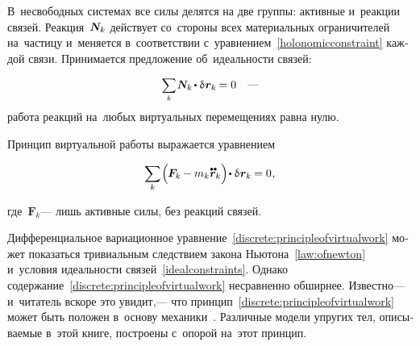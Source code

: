 \begin{otherlanguage}{russian}
В~несвободных системах все силы делятся на две группы: активные и~реакции связей. Реакция~$\mathboldN_k$ действует со~стороны всех материальных ограничителей на~частицу  и~меняется в~соответствии с~уравнением~\eqref{holonomicconstraint} каждой связи. Принимается предложение об~идеальности связей:

\nopagebreak\begin{equation}\label{idealconstraints}
\scalebox{0.9}{$\displaystyle \sum_k$} \hspace{.2ex} \mathboldN_k \hspace{-0.2ex} \dotp \variation{\hspace{.1ex}\bm{r}_k} \hspace{-0.16ex} = 0
\quad \textrm{---}
\vspace{-0.25em}\end{equation}
\noindent работа реакций на~любых виртуальных перемещениях равна нулю.

Принцип виртуальной работы выражается уравнением

\nopagebreak\vspace{-0.1em}\begin{equation}\label{discrete:principleofvirtualwork}
\displaystyle \sum_{\smash{k}} \hspace{-0.2ex} \left(^{\mathstrut} \hspace{-0.25ex} \bm{F}_k \hspace{-0.12ex} - m_k \mathdotdotabove{\bm{r}}_k \right) \hspace{-0.32ex} \dotp \variation{\hspace{.1ex}\bm{r}_k} \hspace{-0.1ex} = 0 \hspace{0.1ex},
\vspace{-0.32em}\end{equation}

\noindent где~${\bm{F}_k}$\:--- лишь активные силы, без реакций связей.

Дифференциальное вариационное уравнение~\eqref{discrete:principleofvirtualwork} может показаться тривиальным следствием закона Ньютона~\eqref{law:ofnewton} и~условия идеальности связей~\eqref{idealconstraints}. Однако содержание~\eqref{discrete:principleofvirtualwork} несравненно обширнее. Известно\:--- и~читатель вскоре это увидит,\:--- что принцип~\eqref{discrete:principleofvirtualwork} может быть положен в~основу механики~\cite{gantmacher}. Различные модели упругих тел, описываемые в~этой книге, построены с~опорой на~этот принцип.


\end{otherlanguage}
